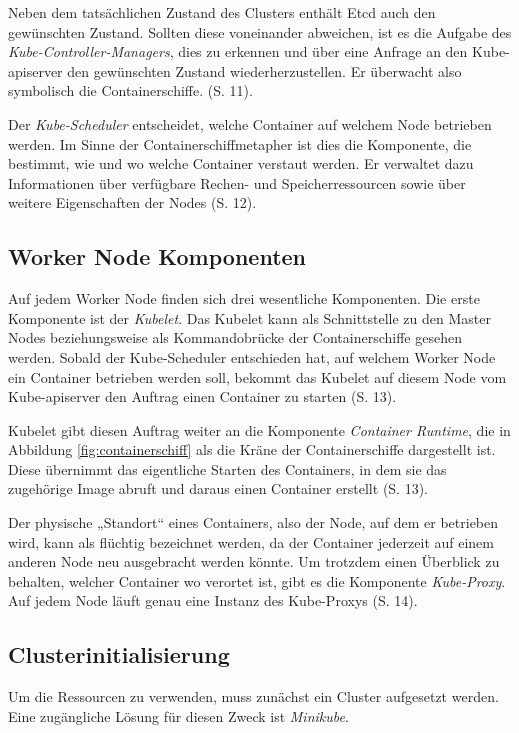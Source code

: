 \documentclass[11pt,a4paper]{article}
\begin{document}
Neben dem tatsächlichen Zustand des Clusters enthält Etcd auch den gewünschten Zustand.
Sollten diese voneinander abweichen, ist es die Aufgabe des \emph{Kube-Controller-Managers},
dies zu erkennen und über eine Anfrage an den Kube-apiserver den gewünschten Zustand wiederherzustellen.
Er überwacht also symbolisch die Containerschiffe. \cite{Schmeling_Dargatz_2022} (S. 11).

Der \emph{Kube-Scheduler} entscheidet, welche Container auf welchem Node betrieben werden.
Im Sinne der Containerschiffmetapher ist dies die Komponente, die bestimmt,
wie und wo welche Container verstaut werden.
Er verwaltet dazu Informationen über verfügbare Rechen- und Speicherressourcen sowie über weitere Eigenschaften
der Nodes \cite{Schmeling_Dargatz_2022} (S. 12).

\subsection{Worker Node Komponenten}
\label{sec:WorkerNodeKomponenten}
Auf jedem Worker Node finden sich drei wesentliche Komponenten.
Die erste Komponente ist der \emph{Kubelet}. Das Kubelet kann als Schnittstelle
zu den Master Nodes beziehungsweise als Kommandobrücke der Containerschiffe gesehen werden.
Sobald der Kube-Scheduler entschieden hat, auf welchem
Worker Node ein Container betrieben werden soll, bekommt das Kubelet auf diesem Node
vom Kube-apiserver den Auftrag einen Container zu starten \cite{Schmeling_Dargatz_2022} (S. 13).

Kubelet gibt diesen Auftrag weiter an die Komponente \emph{Container Runtime}, die
in Abbildung \ref{fig:containerschiff} als die Kräne der Containerschiffe dargestellt ist.
Diese übernimmt das eigentliche Starten des Containers, in dem sie das zugehörige Image
abruft und daraus einen Container erstellt \cite{Schmeling_Dargatz_2022} (S. 13).

Der physische „Standort“ eines Containers, also der Node, auf dem er betrieben wird, kann als
flüchtig bezeichnet werden, da der Container jederzeit auf einem anderen Node neu ausgebracht werden könnte.
Um trotzdem einen Überblick zu behalten, welcher Container wo verortet ist, gibt es die Komponente
\emph{Kube-Proxy}. Auf jedem Node läuft genau eine Instanz des Kube-Proxys \cite{Schmeling_Dargatz_2022} (S. 14).

\subsection{Clusterinitialisierung}
Um die Ressourcen zu verwenden, muss zunächst ein Cluster aufgesetzt werden.
Eine zugängliche Lösung für diesen Zweck ist \emph{Minikube}.
\end{document}
